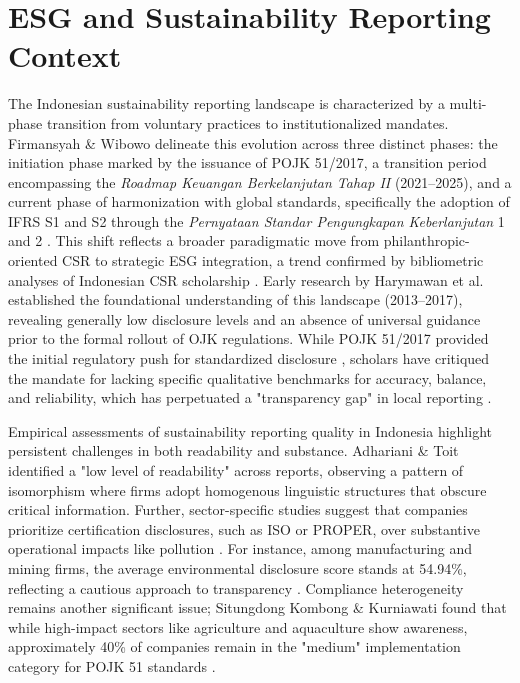 \section{ESG and Sustainability Reporting Context}

The Indonesian sustainability reporting landscape is characterized by a multi-phase transition from voluntary practices to institutionalized mandates. Firmansyah \& Wibowo  \parencite{amrie_firmansyah_200ee100} delineate this evolution across three distinct phases: the initiation phase marked by the issuance of POJK 51/2017, a transition period encompassing the \textit{Roadmap Keuangan Berkelanjutan Tahap II} (2021–2025), and a current phase of harmonization with global standards, specifically the adoption of IFRS S1 and S2 through the \textit{Pernyataan Standar Pengungkapan Keberlanjutan} 1 and 2  \parencite{amrie_firmansyah_200ee100}. This shift reflects a broader paradigmatic move from philanthropic-oriented CSR to strategic ESG integration, a trend confirmed by bibliometric analyses of Indonesian CSR scholarship  \parencite{boubacar_demba_barry_a607dad2}. Early research by Harymawan et al.  \parencite{iman_harymawan_2ef898fe} established the foundational understanding of this landscape (2013–2017), revealing generally low disclosure levels and an absence of universal guidance prior to the formal rollout of OJK regulations. While POJK 51/2017 provided the initial regulatory push for standardized disclosure  \parencite[]{alfonsa_roselina_purnomo_d67da232, kuat_waluyo_jati_45c636dc}, scholars have critiqued the mandate for lacking specific qualitative benchmarks for accuracy, balance, and reliability, which has perpetuated a "transparency gap" in local reporting  \parencite{atika_atika_588ee68a}.

Empirical assessments of sustainability reporting quality in Indonesia highlight persistent challenges in both readability and substance. Adhariani \& Toit  \parencite{desi_adhariani_toit_543335d6} identified a "low level of readability" across reports, observing a pattern of isomorphism where firms adopt homogenous linguistic structures that obscure critical information. Further, sector-specific studies suggest that companies prioritize certification disclosures, such as ISO or PROPER, over substantive operational impacts like pollution  \parencite{indah_fajarini_sri_wahyuningrum_1ce983fb}. For instance, among manufacturing and mining firms, the average environmental disclosure score stands at 54.94\%, reflecting a cautious approach to transparency  \parencite{indah_fajarini_sri_wahyuningrum_1ce983fb}. Compliance heterogeneity remains another significant issue; Situngdong Kombong \& Kurniawati  \parencite{christine_bawaeda_sitandung_kombong_d03ec902} found that while high-impact sectors like agriculture and aquaculture show awareness, approximately 40\% of companies remain in the "medium" implementation category for POJK 51 standards  \parencite{christine_bawaeda_sitandung_kombong_d03ec902}.

